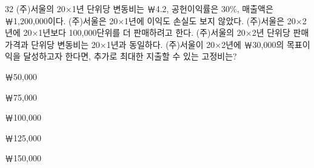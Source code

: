 \begin{question}{32}
(주)서울의 20×1년 단위당 변동비는 ￦4.2, 공헌이익률은 30\%, 매출액은 ￦1,200,000이다. (주)서울은 20×1년에 이익도 손실도 보지 않았다. (주)서울은 20×2년에 20×1년보다 100,000단위를 더 판매하려고 한다. (주)서울의 20×2년 단위당 판매가격과 단위당 변동비는 20×1년과 동일하다. (주)서울이 20×2년에 ￦30,000의 목표이익을 달성하고자 한다면, 추가로 최대한 지출할 수 있는 고정비는?
\begin{choices}
  \item ￦50,000
  \item ￦75,000
  \item ￦100,000
  \item ￦125,000
  \item ￦150,000
\end{choices}
\end{question}
